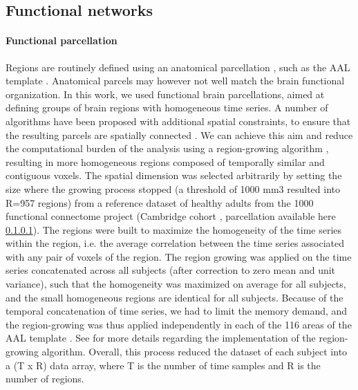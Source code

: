 \documentclass[authoryear]{elsarticle}
\begin{document}
\subsection{Functional networks}

\paragraph{Functional parcellation}
Regions are routinely defined using an anatomical parcellation \citep{He2009}, such as the AAL template \citep{Tzourio-Mazoyer2002}. Anatomical parcels may however not well match the brain functional organization. In this work, we used functional brain parcellations, aimed at defining groups of brain regions with homogeneous time series. A number of algorithms have been proposed with additional spatial constraints, to ensure that the resulting parcels are spatially connected \citep{Lu2003,Thirion2006,Craddock2012}. We can achieve this aim and reduce the computational burden of the analysis using a region-growing algorithm \cite{Bellec2006},  resulting in more homogeneous regions composed of temporally similar and contiguous voxels. The spatial dimension was selected arbitrarily by setting the size where the growing process stopped (a threshold of 1000 mm3 resulted into R=957 regions) from a reference dataset of healthy adults from the 1000 functional connectome project (Cambridge cohort \citep{Biswal2010}, parcellation available here \ref{}). The regions were built to maximize the homogeneity of the time series within the region, i.e. the average correlation between the time series associated with any pair of voxels of the region. The region growing was applied on the time series concatenated across all subjects (after correction to zero mean and unit variance), such that the homogeneity was maximized on average for all subjects, and the small homogeneous regions are identical for all subjects. Because of the temporal concatenation of time series, we had to limit the memory demand, and the region-growing was thus applied independently in each of the 116 areas of the AAL template \citep{Tzourio-Mazoyer2002}. See \cite{Bellec2006} for more details regarding the implementation of the region-growing algorithm. Overall, this process reduced the dataset of each subject into a (T x R) data array, where T is the number of time samples and R is the number of regions.
\end{document}
